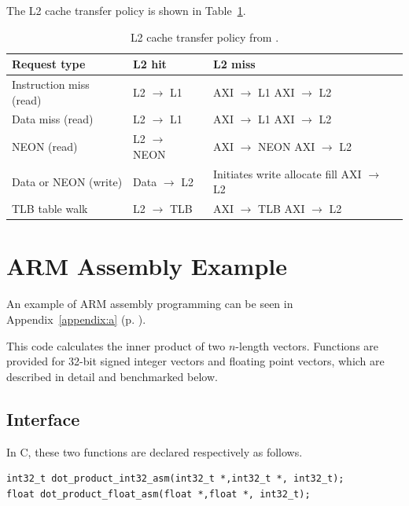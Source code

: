 \documentclass[oneside,a4paper]{report}
\begin{document}
The L2 cache transfer policy is shown in Table~\ref{tab:cachetransfer}.

\begin{table}[htb]
	\centering
	\begin{tabular}{lll}
		\toprule
		Request type			&	L2 hit					&	L2 miss		\\
		\midrule
		Instruction miss (read)	&	L2 $\rightarrow$ L1		&	\parbox[t][6ex]{4cm}{AXI $\rightarrow$ L1	\\ AXI $\rightarrow$ L2}	\\
		Data miss (read)		&	L2 $\rightarrow$ L1		&	\parbox[t][6ex]{4cm}{AXI $\rightarrow$ L1	\\ AXI $\rightarrow$ L2}	\\
		NEON (read)				&	L2 $\rightarrow$ NEON	&	\parbox[t][6ex]{4cm}{AXI $\rightarrow$ NEON	\\ AXI $\rightarrow$ L2}	\\
		Data or NEON (write)	&	Data $\rightarrow$ L2	&	\parbox[t][6ex]{4cm}{Initiates write allocate fill	\\ AXI $\rightarrow$ L2}	\\
		TLB table walk			&	L2 $\rightarrow$ TLB	&	\parbox[t][6ex]{4cm}{AXI $\rightarrow$ TLB	\\ AXI $\rightarrow$ L2}	\\
		\bottomrule
	\end{tabular}
	\caption{L2 cache transfer policy from \cite[p. 8-4]{A8Ref}.}
	\label{tab:cachetransfer}
\end{table}

\chapter{ARM Assembly Example}
An example of ARM assembly programming can be seen in Appendix~\ref{appendix:a} (p. \pageref{appendix:a}).

This code calculates the inner product of two $n$-length vectors. Functions are provided for 32-bit signed integer vectors and floating point vectors, which are described in detail and benchmarked below.

\section{Interface}

In C, these two functions are declared respectively as follows.

\begin{lstlisting}[language={AssemblerC}]
int32_t dot_product_int32_asm(int32_t *,int32_t *, int32_t);
float dot_product_float_asm(float *,float *, int32_t);
\end{lstlisting}
\end{document}
